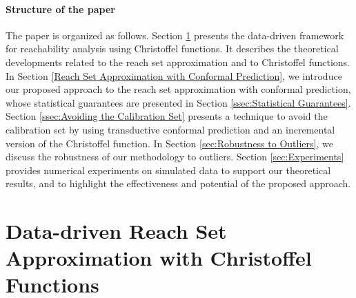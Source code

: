 \documentclass[pmlr]{jmlr}%
\begin{document}
\paragraph{Structure of the paper}
The %
paper is organized as follows. 
Section \ref{sec:Data-Driven SA with Christoffel Functions} presents the data-driven framework for reachability analysis using Christoffel functions. It describes  the theoretical developments related to the reach set approximation and to Christoffel functions. 
In Section \ref{Reach Set Approximation with Conformal Prediction}, we introduce our proposed approach to the 
reach set approximation with conformal prediction, whose statistical guarantees are presented in Section \ref{ssec:Statistical Guarantees}. Section \ref{ssec:Avoiding the Calibration Set} presents a technique to avoid the calibration set by using transductive conformal prediction and an incremental version of the Christoffel function. In Section \ref{sec:Robustness to Outliers}, we discuss the robustness of our methodology to outliers. 
Section \ref{sec:Experiments} provides numerical experiments on simulated data to support our theoretical results, and to highlight the effectiveness and potential of the proposed approach. 

\section{Data-driven Reach Set Approximation with Christoffel Functions}
\label{sec:Data-Driven SA with Christoffel Functions}



\label{ssec:Reach-Set-Approximation}
\end{document}
